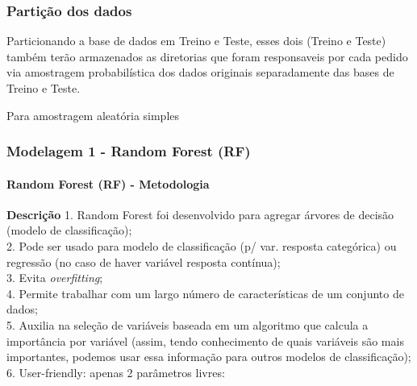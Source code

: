 \documentclass[]{article}
\newenvironment{Shaded}{\begin{snugshade}}{\end{snugshade}}
\newcommand{\KeywordTok}[1]{\textcolor[rgb]{0.13,0.29,0.53}{\textbf{#1}}}
\newcommand{\DataTypeTok}[1]{\textcolor[rgb]{0.13,0.29,0.53}{#1}}
\newcommand{\FloatTok}[1]{\textcolor[rgb]{0.00,0.00,0.81}{#1}}
\newcommand{\StringTok}[1]{\textcolor[rgb]{0.31,0.60,0.02}{#1}}
\newcommand{\OtherTok}[1]{\textcolor[rgb]{0.56,0.35,0.01}{#1}}
\newcommand{\OperatorTok}[1]{\textcolor[rgb]{0.81,0.36,0.00}{\textbf{#1}}}
\newcommand{\NormalTok}[1]{#1}
\let\oldparagraph\paragraph
\renewcommand{\paragraph}[1]{\oldparagraph{#1}\mbox{}}
\begin{document}
\subsubsection{Partição dos dados}\label{particao-dos-dados}

Particionando a base de dados em Treino e Teste, esses dois (Treino e
Teste) também terão armazenados as diretorias que foram responsaveis por
cada pedido via amostragem probabilística dos dados originais
separadamente das bases de Treino e Teste.

Para amostragem aleatória simples

\begin{Shaded}
\end{Shaded}

\subsubsection{Modelagem 1 - Random Forest
(RF)}\label{modelagem-1---random-forest-rf}

\paragraph{Random Forest (RF) -
Metodologia}\label{random-forest-rf---metodologia}

\textbf{Descrição} 1. Random Forest foi desenvolvido para agregar
árvores de decisão (modelo de classificação);\\
2. Pode ser usado para modelo de classificação (p/ var. resposta
categórica) ou regressão (no caso de haver variável resposta
contínua);\\
3. Evita \emph{overfitting};\\
4. Permite trabalhar com um largo número de características de um
conjunto de dados;\\
5. Auxilia na seleção de variáveis baseada em um algoritmo que calcula a
importância por variável (assim, tendo conhecimento de quais variáveis
são mais importantes, podemos usar essa informação para outros modelos
de classificação);\\
6. User-friendly: apenas 2 parâmetros livres:
\end{document}
